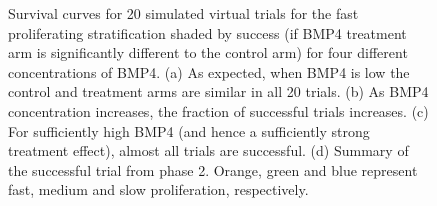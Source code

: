 \documentclass[
  letterpaper,
]{scrreprt}
\theoremstyle{definition}
\theoremstyle{remark}
\begin{document}
\begin{figure}
\begin{minipage}{0.50\linewidth}
{}

\subcaption{\label{fig-ex-4}}

\end{minipage}%
%
\begin{minipage}{0.50\linewidth}


\subcaption{\label{fig-phase2_trial_summary}}

\end{minipage}%

\caption{\label{fig-Identical_mid_KM}Survival curves for 20 simulated
virtual trials for the fast proliferating stratification shaded by
success (if BMP4 treatment arm is significantly different to the control
arm) for four different concentrations of BMP4. (a) As expected, when
BMP4 is low the control and treatment arms are similar in all 20 trials.
(b) As BMP4 concentration increases, the fraction of successful trials
increases. (c) For sufficiently high BMP4 (and hence a sufficiently
strong treatment effect), almost all trials are successful. (d) Summary
of the successful trial from phase 2. Orange, green and blue represent
fast, medium and slow proliferation, respectively.}

\end{figure}%
\end{document}
